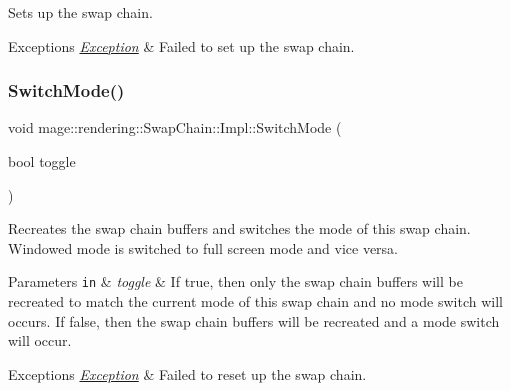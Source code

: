 Sets up the swap chain.


\begin{DoxyExceptions}{Exceptions}
{\em \mbox{\hyperlink{classmage_1_1_exception}{Exception}}} & Failed to set up the swap chain. \\
\hline
\end{DoxyExceptions}
\mbox{\label{classmage_1_1rendering_1_1_swap_chain_1_1_impl_aa3c391f6651074e73105174b68025731}} 
\subsubsection{\texorpdfstring{Switch\+Mode()}{SwitchMode()}}
{\footnotesize\ttfamily void mage\+::rendering\+::\+Swap\+Chain\+::\+Impl\+::\+Switch\+Mode (\begin{DoxyParamCaption}\item[{bool}]{toggle }\end{DoxyParamCaption})}

Recreates the swap chain buffers and switches the mode of this swap chain. Windowed mode is switched to full screen mode and vice versa.


\begin{DoxyParams}[1]{Parameters}
\mbox{\tt in}  & {\em toggle} & If {\ttfamily true}, then only the swap chain buffers will be recreated to match the current mode of this swap chain and no mode switch will occurs. If {\ttfamily false}, then the swap chain buffers will be recreated and a mode switch will occur. \\
\hline
\end{DoxyParams}

\begin{DoxyExceptions}{Exceptions}
{\em \mbox{\hyperlink{classmage_1_1_exception}{Exception}}} & Failed to reset up the swap chain. \\
\hline
\end{DoxyExceptions}
\mbox{\label{classmage_1_1rendering_1_1_swap_chain_1_1_impl_a342862bf40dd80b43ee14d504c454a6e}} 
